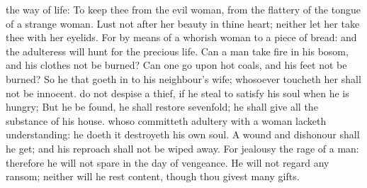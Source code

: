 {{} the
way of
life:
To
keep thee from the
evil
woman, from the
flattery of the
tongue of a strange
woman.
Lust not after her
beauty in thine
heart; neither let her
take thee with her
eyelids.
For by means
of a
whorish
woman
{} to a
piece of
bread: and the
adulteress will
hunt for the
precious
life.
Can a
man
take
fire in his
bosom, and his
clothes not be
burned?
Can
one
go upon hot
coals, and his
feet not be
burned?
So he that goeth
in to his
neighbour’s
wife; whosoever
toucheth her shall not be
innocent.
 do not
despise a
thief, if he
steal to
satisfy his
soul when he is
hungry;
But
{} he be
found, he shall
restore
sevenfold; he shall
give all the
substance of his
house.
 whoso committeth
adultery with a
woman
lacketh
understanding: he
{}
doeth it
destroyeth his own
soul.
A
wound and
dishonour shall he
get; and his
reproach shall not be wiped
away.
For
jealousy
{} the
rage of a
man: therefore he will not
spare in the
day of
vengeance.
He will not
regard any
ransom; neither will he rest
content, though thou givest
many
gifts.

}
